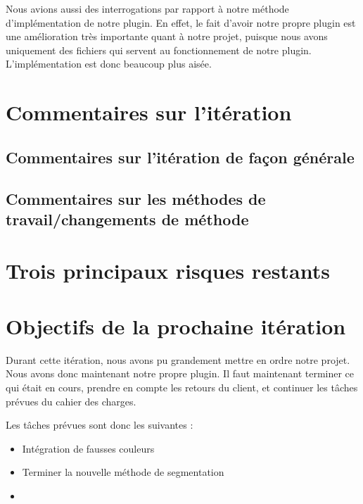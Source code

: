 \documentclass[12pt,titlepage,french]{article}
\begin{document}
Nous avions aussi des interrogations par rapport à notre méthode d'implémentation de notre plugin. En effet, le fait d'avoir notre propre plugin est une amélioration très importante quant à notre projet, puisque nous avons uniquement des fichiers qui servent au fonctionnement de notre plugin. L'implémentation est donc beaucoup plus aisée.

\section{Commentaires sur l'itération}

\subsection{Commentaires sur l'itération de façon générale}

\subsection{Commentaires sur les méthodes de travail/changements de méthode}

\section{Trois principaux risques restants}


\section{Objectifs de la prochaine itération}

Durant cette itération, nous avons pu grandement mettre en ordre notre projet. Nous avons donc maintenant notre propre plugin. Il faut maintenant terminer ce qui était en cours, prendre en compte les retours du client, et continuer les tâches prévues du cahier des charges.

Les tâches prévues sont donc les suivantes :

\begin{itemize}
  \item Intégration de fausses couleurs
  \item Terminer la nouvelle méthode de segmentation
  \item 
\end{itemize}
\end{document}
